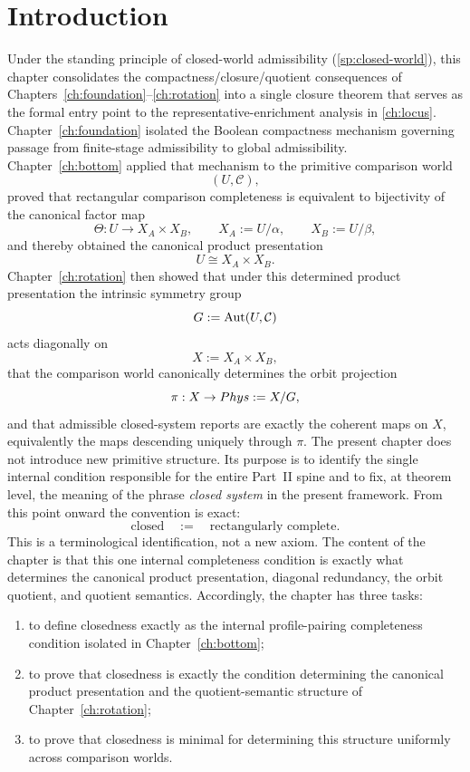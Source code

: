 \section{Introduction}
Under the standing principle of closed-world admissibility
(\cref{sp:closed-world}), this chapter consolidates the
compactness/closure/quotient consequences of
Chapters~\ref{ch:foundation}--\ref{ch:rotation} into a single closure
theorem that serves as the formal entry point to the
representative-enrichment analysis in \cref{ch:locus}.
Chapter~\ref{ch:foundation} isolated the Boolean compactness mechanism
governing passage from finite-stage admissibility to global
admissibility. Chapter~\ref{ch:bottom} applied that mechanism to the
primitive comparison world
\[
	(U,\mathcal C),
\]
proved that rectangular comparison completeness is equivalent to
bijectivity of the canonical factor map
\[
	\Theta:U\to X_A\times X_B,
	\qquad
	X_A:=U/\alpha,
	\qquad
	X_B:=U/\beta,
\]
and thereby obtained the canonical product presentation
\[
	U\cong X_A\times X_B.
\]
Chapter~\ref{ch:rotation} then showed that under this determined product
presentation the intrinsic symmetry group
\[
	G:=\operatorname{Aut}(U,\mathcal C)
\]
acts diagonally on
\[
	X:=X_A\times X_B,
\]
that the comparison world canonically determines the orbit projection
\[
	\pi:X\to Phys:=X/G,
\]
and that admissible closed-system reports are exactly the coherent maps
on \(X\), equivalently the maps descending uniquely through \(\pi\).
The present chapter does not introduce new primitive structure. Its
purpose is to identify the single internal condition responsible for the
entire Part~II spine and to fix, at theorem level, the meaning of the
phrase \emph{closed system} in the present framework.
From this point onward the convention is exact:
\[
	\text{closed}
	\quad:=\quad
	\text{rectangularly complete}.
\]
This is a terminological identification, not a new axiom. The content of
the chapter is that this one internal completeness condition is exactly
what determines the canonical product presentation, diagonal redundancy, the
orbit quotient, and quotient semantics.
Accordingly, the chapter has three tasks:
\begin{enumerate}[label=\textup{(\roman*)}]
	\item
	      to define closedness exactly as the internal profile-pairing
	      completeness condition isolated in Chapter~\ref{ch:bottom};
	\item
	      to prove that closedness is exactly the condition determining the canonical
	      product presentation and the quotient-semantic structure of
	      Chapter~\ref{ch:rotation};
	\item
	      to prove that closedness is minimal for determining this structure
	      uniformly across comparison worlds.
\end{enumerate}
